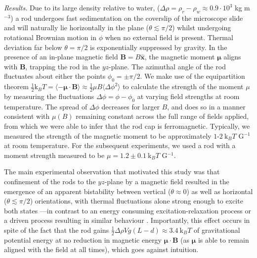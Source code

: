 \documentclass[aps,prl,twocolumn,superscriptaddress]{revtex4-1}
\newcommand{\vcrm}[1]{\mathbf{#1}}
\newcommand{\hvcrm}[1]{\mathbf{\hat{#1}}}
\newcommand{\vc}[1]{\boldsymbol{#1}}
\newcommand{\kk}{\mathrm{k}_B}
\begin{document}
%
%
%
%
%
%
%
\emph{Results.} Due to its large density relative to water, ($\Delta\rho = \rho_r - \rho_w \approx 0.9 \cdot 10^3$ kg m$^{-3}$) a rod undergoes fast sedimentation on the coverslip of the microscope slide and will naturally lie horizontally in the plane ($\theta\lesssim\pi/2$) whilst undergoing rotational Brownian motion in $\phi$ when no external field is present. Thermal deviation far below $\theta=\pi/2$ is exponentially suppressed by gravity. In the presence of an in-plane magnetic field $\vcrm{B}=B \hvcrm{x}$, the magnetic moment $\vc{\mu}$ aligns with $\vcrm{B}$, trapping the rod in the $yz$-plane. The azimuthal angle of the rod fluctuates about either the points $\phi_0=\pm\pi/2$. We make use of the equipartition theorem $ \frac{1}{2}\kk T = \langle -\vc{\mu}\cdot\vcrm{B}\rangle \approx \frac{1}{2}\mu B \langle \Delta\phi^2 \rangle $ to calculate the strength of the moment $\mu$ by measuring the fluctuations $\Delta\phi=\phi-\phi_0$ at varying field strengths at room temperature. The spread of $\Delta\phi$ decreases for larger $B$, and does so in a manner consistent with $\mu(B)$ remaining constant across the full range of fields applied, from which we were able to infer that the rod cap is ferromagnetic. Typically, we measured the strength of the magnetic moment to be approximately $1$-$2\ \kk T $ G$^{-1}$ at room temperature. For the subsequent experiments, we used a rod with a moment strength measured to be $\mu = 1.2\pm0.1\ \kk T$ G$^{-1}$.

The main experimental observation that motivated this study was that confinement of the rods to the $yz$-plane by a magnetic field resulted in the emergence of an apparent bistability between vertical ($\theta \approx 0$) as well as horizontal ($\theta \lesssim \pi/2$) orientations, with thermal fluctuations alone strong enough to excite both states ---in contrast to an energy consuming excitation-relaxation process or a driven process resulting in similar behaviour \cite{Dhar2007}. Importantly, this effect occurs in spite of the fact that the rod gains $\frac{1}{2}\Delta\rho V g (L-d) \approx 3.4 \ \kk T$ of gravitational potential energy at no reduction in magnetic energy $\vc{\mu}\cdot \vcrm{B}$ (as $\vc{\mu}$ is able to remain aligned with the field at all times), which goes against intuition.
\end{document}
